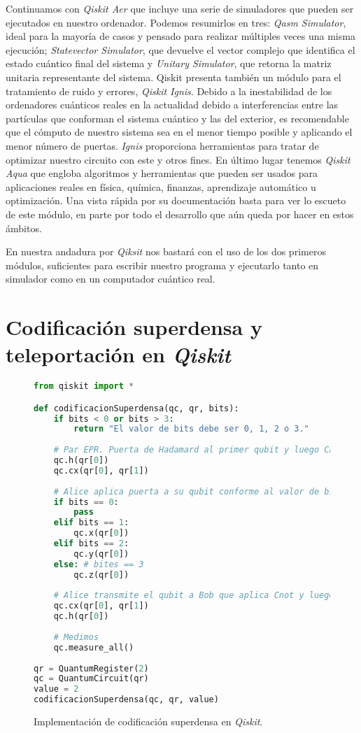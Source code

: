 Continuamos con \textit{Qiskit Aer} que incluye una serie de simuladores que pueden ser ejecutados en nuestro ordenador. Podemos resumirlos en tres: \textit{Qasm Simulator}, ideal para la mayoría de casos y pensado para realizar múltiples veces una misma ejecución; \textit{Statevector Simulator}, que devuelve el vector complejo que identifica el estado cuántico final del sistema y \textit{Unitary Simulator}, que retorna la matriz unitaria representante del sistema. Qiskit presenta también un módulo para el tratamiento de ruido y errores, \textit{Qiskit Ignis}. Debido a la inestabilidad de los ordenadores cuánticos reales en la actualidad debido a interferencias entre las partículas que conforman el sistema cuántico y las del exterior, es recomendable que el cómputo de nuestro sistema sea en el menor tiempo posible y aplicando el menor número de puertas. \textit{Ignis} proporciona herramientas para tratar de optimizar nuestro circuito con este y otros fines. En último lugar tenemos \textit{Qiskit Aqua} que engloba algoritmos y herramientas que pueden ser usados para aplicaciones reales en física, química, finanzas, aprendizaje automático u optimización. Una vista rápida por su documentación basta para ver lo escueto de este módulo, en parte por todo el desarrollo que aún queda por hacer en estos ámbitos.

En nuestra andadura por \textit{Qiksit} nos bastará con el uso de los dos primeros módulos, suficientes para escribir nuestro programa y ejecutarlo tanto en simulador como en un computador cuántico real.

\section{Codificación superdensa y teleportación en \textit{Qiskit}}
\begin{figure}[htb!]
\begin{lstlisting}[language=Python]
from qiskit import *

def codificacionSuperdensa(qc, qr, bits):
    if bits < 0 or bits > 3:
        return "El valor de bits debe ser 0, 1, 2 o 3."
    
    # Par EPR. Puerta de Hadamard al primer qubit y luego Cnot.
    qc.h(qr[0])
    qc.cx(qr[0], qr[1])
    
    # Alice aplica puerta a su qubit conforme al valor de bits
    if bits == 0:
        pass
    elif bits == 1:
        qc.x(qr[0])
    elif bits == 2:
        qc.y(qr[0])
    else: # bites == 3
        qc.z(qr[0])
        
    # Alice transmite el qubit a Bob que aplica Cnot y luego Hadamard al qubit recibido
    qc.cx(qr[0], qr[1])
    qc.h(qr[0])
    
    # Medimos
    qc.measure_all()
    
qr = QuantumRegister(2)
qc = QuantumCircuit(qr)
value = 2
codificacionSuperdensa(qc, qr, value)
\end{lstlisting}
\caption{Implementación de codificación superdensa en \textit{Qiskit}.}
\label{fig:code51}
\end{figure}

